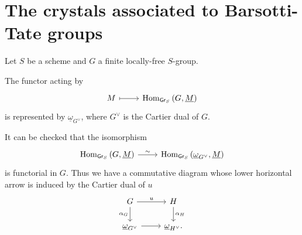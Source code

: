 \documentclass[../Main]{subfiles}
\begin{document}
\section{The crystals associated to Barsotti-Tate groups}
Let $S$ be a scheme and $G$ a finite locally-free $S$-group.

\begin{prop}
	The functor acting by
	\begin{equation*}
	\begin{tikzcd}[row sep = 0ex
		,/tikz/column 1/.append style={anchor=base east}
		,/tikz/column 2/.append style={anchor=base west}]
		M \arrow[r, "", mapsto] & \mathrm{Hom}_{ \mathsf{Gr}_S } \left( G, \underline{M} \right)
	\end{tikzcd}
	\end{equation*} 
	is represented by $\underline{\omega}_{G^\vee}$, where $G^\vee$ is
	the Cartier dual of $G$.
\end{prop}


\begin{rem}[]
	It can be checked that the isomorphism
	\begin{equation*}
	\begin{tikzcd}[row sep = 0ex
		,/tikz/column 1/.append style={anchor=base east}
		,/tikz/column 2/.append style={anchor=base west}]
		\mathrm{Hom}_{\mathsf{Gr}_S} \left( G, \underline{M} \right)
		\arrow[r, "\sim", rightarrow] &
		\mathrm{Hom}_{\mathsf{Gr}_S} \left( \underline{\omega}_{G^\vee}, \underline{M} \right)
	\end{tikzcd}
	\end{equation*} 
	is functorial in $G$.
	Thus we have a commutative diagram whose lower horizontal arrow is
	induced by the Cartier dual of $u$
	\begin{equation*}
	\begin{tikzcd}
		G \arrow[r, "u", rightarrow] 
		\arrow[d, "\alpha_G"', rightarrow] &
		H \arrow[d, "\alpha_H", rightarrow] \\
		\underline{\omega}_{G^\vee} \arrow[r, "", rightarrow] &
		\underline{\omega}_{H^\vee}
	.\end{tikzcd}
	\end{equation*}
\end{rem}
\end{document}
